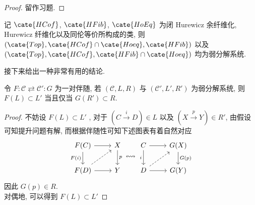 \begin{proof}
    留作习题.
\end{proof}
\begin{example}
    记 $\cate{HCof}$, $\cate{HFib}$, $\cate{HoEq}$ 为闭 Hurewicz 余纤维化, Hurewicz 纤维化以及同伦等价所构成的类, 则 $(\cate{Top}, \cate{HCof}\cap \cate{Hoeq}, \cate{HFib})$ 以及 $(\cate{Top}, \cate{HCof}, \cate{HFib}\cap \cate{Hoeq})$ 均为弱分解系统.
\end{example}
接下来给出一种非常有用的结论.
\begin{proposition}
    令 $F\colon \mathcal{C} \rightleftarrows \mathcal{C}'\colon G$ 为一对伴随, 若 $(\mathcal{C},L,R)$ 与 $(\mathcal{C}',L',R')$ 为弱分解系统, 则 $F(L)\subset L'$ 当且仅当 $G(R')\subset R$.
\end{proposition}
\begin{proof}
    不妨设 $F(L)\subset L'$ , 对于 $(C\xrightarrow{i}D)\in L$ 以及 $(X\xrightarrow{p}Y)\in R'$, 由假设可知提升问题有解, 而根据伴随性可知下述图表有着自然对应
    \[\begin{tikzcd}
	{F(C)} & X \\
	{F(D)} & Y
	\arrow[from=1-1, to=1-2]
	\arrow["{F(i)}"', from=1-1, to=2-1]
	\arrow["p", from=1-2, to=2-2]
	\arrow[dashed, from=2-1, to=1-2]
	\arrow[from=2-1, to=2-2]
    \end{tikzcd} \leftrightsquigarrow  \begin{tikzcd}
	C & {G(X)} \\
	D & {G(Y)}
	\arrow[from=1-1, to=1-2]
	\arrow["i"', from=1-1, to=2-1]
	\arrow["{G(p)}", from=1-2, to=2-2]
	\arrow[dashed, from=2-1, to=1-2]
	\arrow[from=2-1, to=2-2]
\end{tikzcd}\]
因此 $G(p)\in R$.\\
对偶地, 可以得到 $F(L) \subset L'$
\end{proof}
